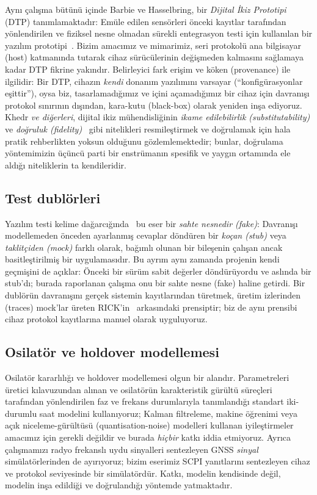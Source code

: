 \documentclass[9pt,twocolumn,a4paper]{extarticle}
\begin{document}
Aynı çalışma bütünü içinde Barbie ve Hasselbring, bir \emph{Dijital İkiz Prototipi} (DTP) tanımlamaktadır: Emüle edilen sensörleri önceki kayıtlar tarafından yönlendirilen ve fiziksel nesne olmadan sürekli entegrasyon testi için kullanılan bir yazılım prototipi~\cite{barbie2024dtp,barbie2023smartfarming}. Bizim amacımız ve mimarimiz, seri protokolü ana bilgisayar (host) katmanında tutarak cihaz sürücülerinin değişmeden kalmasını sağlamaya kadar DTP fikrine yakındır. Belirleyici fark erişim ve köken (provenance) ile ilgilidir: Bir DTP, cihazın \emph{kendi} donanım yazılımını varsayar (``konfigürasyonlar eşittir''), oysa biz, tasarlamadığımız ve içini açamadığımız bir cihaz için davranışı protokol sınırının dışından, kara-kutu (black-box) olarak yeniden inşa ediyoruz. Khedr \emph{ve diğerleri}, dijital ikiz mühendisliğinin \emph{ikame edilebilirlik (substitutability)} ve \emph{doğruluk (fidelity)}~\cite{khedr2026sos} gibi nitelikleri resmileştirmek ve doğrulamak için hala pratik rehberlikten yoksun olduğunu gözlemlemektedir; bunlar, doğrulama yöntemimizin üçüncü parti bir enstrümanın spesifik ve yaygın ortamında ele aldığı niteliklerin ta kendileridir.

\subsection{Test dublörleri}
Yazılım testi kelime dağarcığında~\cite{meszaros2007xunit,fowler2007mocks} bu eser bir \emph{sahte nesnedir (fake)}: Davranışı modellemeden önceden ayarlanmış cevaplar döndüren bir \emph{koçan (stub)} veya \emph{taklitçiden (mock)} farklı olarak, bağımlı olunan bir bileşenin çalışan ancak basitleştirilmiş bir uygulamasıdır. Bu ayrım aynı zamanda projenin kendi geçmişini de açıklar: Önceki bir sürüm sabit değerler döndürüyordu ve aslında bir stub'dı; burada raporlanan çalışma onu bir sahte nesne (fake) haline getirdi. Bir dublörün davranışını gerçek sistemin kayıtlarından türetmek, üretim izlerinden (traces) mock'lar üreten RICK'in~\cite{tiwari2023rick} arkasındaki prensiptir; biz de aynı prensibi cihaz protokol kayıtlarına manuel olarak uyguluyoruz.

\subsection{Osilatör ve holdover modellemesi}
Osilatör kararlılığı ve holdover modellemesi olgun bir alandır. Parametreleri üretici kılavuzundan alınan ve osilatörün karakteristik gürültü süreçleri~\cite{zucca2005clock} tarafından yönlendirilen faz ve frekans durumlarıyla tanımlandığı standart iki-durumlu saat modelini kullanıyoruz; Kalman filtreleme, makine öğrenimi veya açık niceleme-gürültüsü (quantisation-noise) modelleri kullanan iyileştirmeler amacımız için gerekli değildir ve burada \emph{hiçbir} katkı iddia etmiyoruz. Ayrıca çalışmamızı radyo frekanslı uydu sinyalleri sentezleyen GNSS \emph{sinyal} simülatörlerinden de ayırıyoruz; bizim eserimiz SCPI yanıtlarını sentezleyen cihaz ve protokol seviyesinde bir simülatördür. Katkı, modelin kendisinde değil, modelin inşa edildiği ve doğrulandığı yöntemde yatmaktadır.
\end{document}

